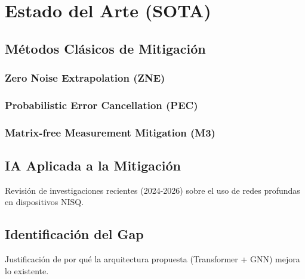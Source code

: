 \chapter{Estado del Arte (SOTA)}
\label{cap:sota}

\section{Métodos Clásicos de Mitigación}
\subsection{Zero Noise Extrapolation (ZNE)}
\subsection{Probabilistic Error Cancellation (PEC)}
\subsection{Matrix-free Measurement Mitigation (M3)}

\section{IA Aplicada a la Mitigación}
Revisión de investigaciones recientes (2024-2026) sobre el uso de redes profundas en dispositivos NISQ.

\section{Identificación del Gap}
Justificación de por qué la arquitectura propuesta (Transformer + GNN) mejora lo existente.